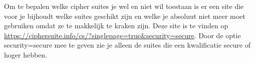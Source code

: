 Om te bepalen welke cipher suites je wel en niet wil toestaan is er een site die voor je bijhoudt welke suites geschikt zijn en welke je absoluut niet meer moet gebruiken omdat ze te makkelijk te kraken zijn. Deze site is te vinden op \url{https://ciphersuite.info/cs/?singlepage=true&security=secure}. Door de optie security=secure mee te geven zie je alleen de suites die een kwalificatie secure of hoger hebben.
